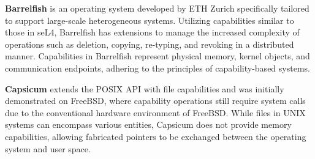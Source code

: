 

\textbf{Barrelfish} is an operating system developed by ETH Zurich specifically tailored to support large-scale heterogeneous systems. Utilizing capabilities 
similar to those in seL4, Barrelfish has extensions to manage the increased complexity of operations such as deletion, copying, re-typing, 
and revoking in a distributed manner. Capabilities in Barrelfish represent physical memory, kernel objects, and communication 
endpoints, adhering to the principles of capability-based systems.
\newline

\textbf{Capsicum} extends the POSIX API with file capabilities and was initially demonstrated on FreeBSD, where capability operations still require 
system calls due to the conventional hardware environment of FreeBSD. While files in UNIX systems can encompass various entities, 
Capsicum does not provide memory capabilities, allowing fabricated pointers to be exchanged between the operating system and user space.
\newline

